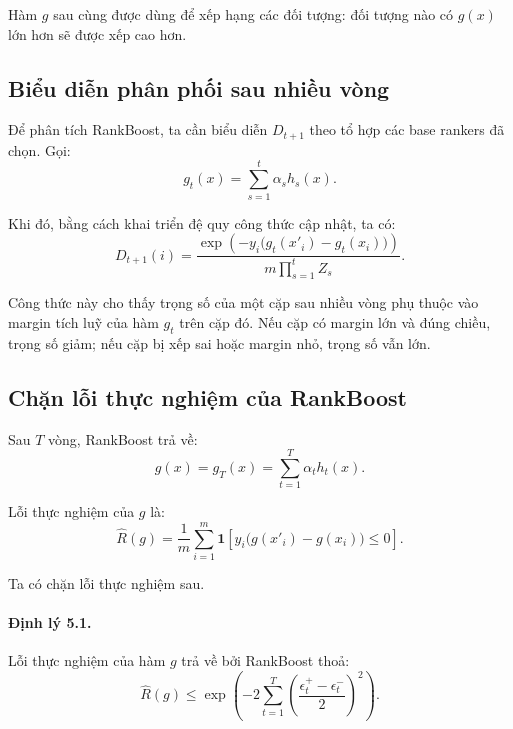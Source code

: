 Hàm \(g\) sau cùng được dùng để xếp hạng các đối tượng: đối tượng nào có \(g(x)\) lớn hơn sẽ được xếp cao hơn.

\subsection{Biểu diễn phân phối sau nhiều vòng}

Để phân tích RankBoost, ta cần biểu diễn \(D_{t+1}\) theo tổ hợp các base rankers đã chọn. Gọi:
\[
    g_t(x)
    =
    \sum_{s=1}^{t}
    \alpha_s h_s(x).
\]

Khi đó, bằng cách khai triển đệ quy công thức cập nhật, ta có:
\begin{equation}
    D_{t+1}(i)
    =
    \frac{
        \exp
        \left(
            -y_i
            \big(g_t(x'_i)-g_t(x_i)\big)
        \right)
    }{
        m
        \prod_{s=1}^{t}Z_s
    }.
    \label{eq:section5-distribution-closed-form}
\end{equation}

Công thức này cho thấy trọng số của một cặp sau nhiều vòng phụ thuộc vào margin tích luỹ của hàm \(g_t\) trên cặp đó. Nếu cặp có margin lớn và đúng chiều, trọng số giảm; nếu cặp bị xếp sai hoặc margin nhỏ, trọng số vẫn lớn.

\subsection{Chặn lỗi thực nghiệm của RankBoost}

Sau \(T\) vòng, RankBoost trả về:
\[
    g(x)=g_T(x)=\sum_{t=1}^{T}\alpha_t h_t(x).
\]

Lỗi thực nghiệm của \(g\) là:
\begin{equation}
    \widehat{R}(g)
    =
    \frac{1}{m}
    \sum_{i=1}^{m}
    \mathbf{1}
    \left[
        y_i
        \big(g(x'_i)-g(x_i)\big)
        \leq 0
    \right].
    \label{eq:section5-rankboost-empirical-error}
\end{equation}

Ta có chặn lỗi thực nghiệm sau.

\paragraph{Định lý 5.1.}
Lỗi thực nghiệm của hàm \(g\) trả về bởi RankBoost thoả:
\begin{equation}
    \widehat{R}(g)
    \leq
    \exp
    \left(
        -2
        \sum_{t=1}^{T}
        \left(
            \frac{\epsilon_t^{+}-\epsilon_t^{-}}{2}
        \right)^2
    \right).
    \label{eq:section5-rankboost-empirical-bound}
\end{equation}

